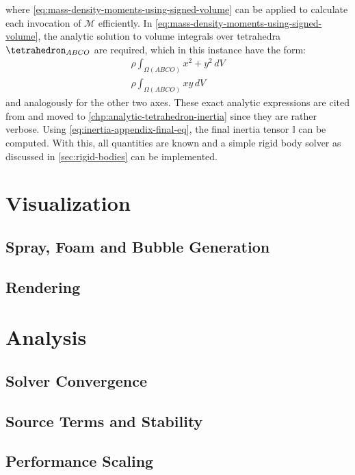 \documentclass[oneside, a4paper]{book}
\newcommand\br[1]{\left(#1\right)}
\begin{document}
  where \autoref{eq:mass-density-moments-using-signed-volume} can be applied to calculate each invocation of $\mathcal{M}$ efficiently. In \autoref{eq:mass-density-moments-using-signed-volume}, the analytic solution to volume integrals over tetrahedra $\tetrahedron_{ABCO}$ are required, which in this instance have the form:
  \begin{align}
    \rho \int_{\Omega\br{ABCO}} x^2+y^2\, dV\\
    \rho \int_{\Omega\br{ABCO}} xy\, dV
  \end{align}
  and analogously for the other two axes. These exact analytic expressions are cited from \autocite[Tonon]{explicit-exact-tetrahedron-formulas} and moved to \autoref{chp:analytic-tetrahedron-inertia} since they are rather verbose. Using \autoref{eq:inertia-appendix-final-eq}, the final inertia tensor $\mathds{I}$ can be computed. With this, all quantities are known and a simple rigid body solver as discussed in \autoref{sec:rigid-bodies} can be implemented.


\chapter{Visualization}\label{chp:visualization}
    \section{Spray, Foam and Bubble Generation}
    \section{Rendering}
\chapter{Analysis}\label{chp:analysis}
    \section{Solver Convergence}
    \section{Source Terms and Stability}
    \section{Performance Scaling}
\end{document}
